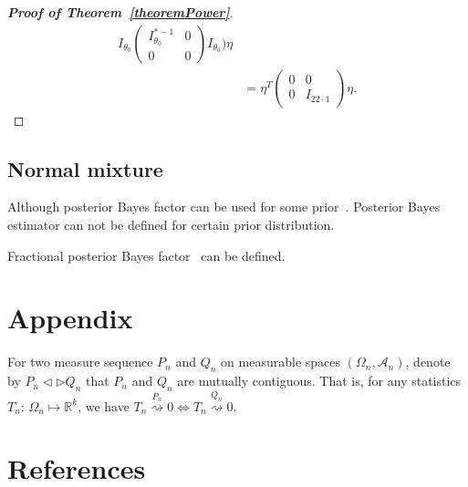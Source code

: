 \documentclass[3p]{elsarticle}
\theoremstyle{plain}
\theoremstyle{definition}
\theoremstyle{remark}
\begin{document}
\begin{proof}[\textbf{Proof of Theorem~\ref{theoremPower}}]
\begin{equation}
\begin{aligned}
        I_{\theta_0}
        \left(\begin{matrix} 
                I^{*-1}_{\theta_0}&0\\
                0&0
        \end{matrix}\right)
        I_{\theta_0}
    )\eta
    \\
    &=\eta^T
    \left(
        \begin{matrix}
            0&0\\
            0&I_{22\cdot 1}
        \end{matrix}
    \right)
    \eta.
    \end{aligned}
\end{equation}
\end{proof}









\subsection{Normal mixture}

Although posterior Bayes factor can be used for some prior~\cite{Aitkin1996}.
Posterior Bayes estimator can not be defined for certain prior distribution.

Fractional posterior Bayes factor~\citep{Fractional1995} can be defined.


%




\section{Appendix}
For two measure sequence $P_n$ and $Q_n$ on measurable spaces $(\Omega_n,\mathcal{A}_n)$, denote by $P_n\triangleleft \triangleright Q_n$ that $P_n$ and $Q_n$ are mutually contiguous. That is, for any statistics $T_n$: $\Omega_n\mapsto \mathbb{R}^k$, we have $T_n\overset{P_n}{\rightsquigarrow}0\Leftrightarrow T_n\overset{Q_n}{\rightsquigarrow}0$.



\section*{References}


\end{document}
